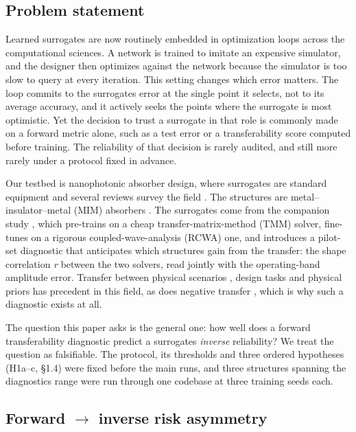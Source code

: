 \documentclass[11pt,a4paper]{article}
\begin{document}
\subsection{Problem statement}\label{sec:1.1}

Learned surrogates are now routinely embedded in optimization loops across the computational sciences. A network is trained to imitate an expensive simulator, and the designer then optimizes against the network because the simulator is too slow to query at every iteration. This setting changes which error matters. The loop commits to the surrogate\textquotesingle s error at the single point it selects, not to its average accuracy, and it actively seeks the points where the surrogate is most optimistic. Yet the decision to trust a surrogate in that role is commonly made on a forward metric alone, such as a test error or a transferability score computed before training. The reliability of that decision is rarely audited, and still more rarely under a protocol fixed in advance.

Our testbed is nanophotonic absorber design, where surrogates are standard equipment and
several reviews survey the field \cite{ma20213,jiang20214,wiecha20215,so20206,khairehwalieh20237}. The structures are metal--insulator--metal (MIM) absorbers \cite{landy20082}. The surrogates come from the companion study \cite{choi20261}, which pre-trains on a cheap transfer-matrix-method (TMM) solver, fine-tunes on a rigorous coupled-wave-analysis (RCWA) one, and introduces a
pilot-set diagnostic that anticipates which structures gain from the transfer: the shape
correlation \emph{r} between the two solvers, read jointly with the operating-band amplitude
error. Transfer between physical scenarios \cite{qu20198}, design tasks \cite{peng20249} and physical priors
\cite{zhu202510,kim202511} has precedent in this field, as does negative transfer \cite{zhang202312}, which is why such a
diagnostic exists at all.

The question this paper asks is the general one: how well does a forward transferability diagnostic predict a surrogate\textquotesingle s \emph{inverse} reliability? We treat the question as falsifiable. The protocol, its thresholds and three ordered hypotheses (H1a--c, \S{}1.4) were fixed before the main runs, and three structures spanning the diagnostic\textquotesingle s range were run through one codebase at three training seeds each.

\subsection{Forward \ensuremath{\rightarrow} inverse risk asymmetry}\label{sec:1.2}
\end{document}
